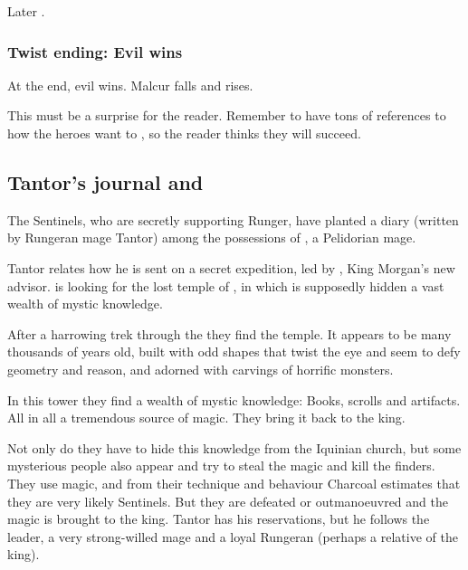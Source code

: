 \begin{garbage}
Later . 





\subsubsection{Twist ending: Evil wins}
At the end, evil wins. 
Malcur falls and \Nithdornazsh{} rises. 

This must be a surprise for the reader. 
Remember to have tons of references to how the heroes want to , so the reader thinks they will succeed. 









\subsection{Tantor's journal and \EreshKal}
The Sentinels, who are secretly supporting Runger, have planted a diary (written by Rungeran mage \Jirad{} Tantor) among the possessions of \Ambrose{} \Onatol, a Pelidorian \ishrah{} mage. 

Tantor relates how he is sent on a secret expedition, led by \Takestsha, King Morgan's new advisor. \Takestsha{} is looking for the lost temple of \Rungertemple, in which is supposedly hidden a vast wealth of mystic knowledge. 

After a harrowing trek through the \Wylde{} they find the temple. It appears to be many thousands of years old, built with odd shapes that twist the eye and seem to defy geometry and reason, and adorned with carvings of horrific monsters. 

In this tower they find a wealth of mystic knowledge: Books, scrolls and artifacts. All in all a tremendous source of magic. They bring it back to the king. 

Not only do they have to hide this knowledge from the Iquinian church, but some mysterious people also appear and try to steal the magic and kill the finders. They use magic, and from their technique and behaviour Charcoal estimates that they are very likely Sentinels. But they are defeated or outmanoeuvred and the magic is brought to the king. Tantor has his reservations, but he follows the leader, a very strong-willed mage and a loyal Rungeran (perhaps a relative of the king). 


\end{garbage}
